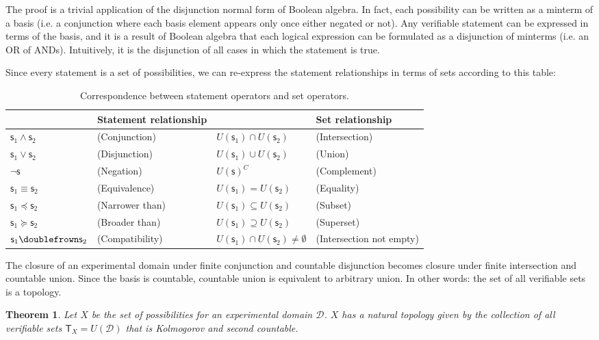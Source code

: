 \documentclass[letterpaper]{article}
\theoremstyle{plain}%
\newtheorem{thrm}{Theorem}[section]
\theoremstyle{definition}
\theoremstyle{remark}
\def\comp{\doublefrown}
\def\narrower{\preccurlyeq}
\def\broader{\succcurlyeq}
\def\AND{\wedge}
\def\OR{\vee}
\def\NOT{\neg}
\newcommand{\stmt}[1][s] {\mathsf{#1}}
\newcommand{\edomain}[1][D] {\mathcal{#1}}
\begin{document}
The proof is a trivial application of the disjunction normal form of Boolean algebra. In fact, each possibility can be written as a minterm of a basis (i.e. a conjunction where each basis element appears only once either negated or not). Any verifiable statement can be expressed in terms of the basis, and it is a result of Boolean algebra that each logical expression can be formulated as a disjunction of minterms (i.e. an OR of ANDs). Intuitively, it is the disjunction of all cases in which the statement is true.

Since every statement is a set of possibilities, we can re-express the statement relationships in terms of sets according to this table:

\begin{table}[h]
	\centering
	\begin{tabular}{p{} p{} p{} p{}}
		& Statement relationship & & Set relationship  \\ 
		\hline 
		$\stmt_1 \AND \stmt_2$ & (Conjunction) & $U(\stmt_1) \cap U(\stmt_2)$ & (Intersection) \\ 
		$\stmt_1 \OR \stmt_2$ & (Disjunction) & $U(\stmt_1) \cup U(\stmt_2)$ & (Union) \\ 
		$\NOT \stmt$ & (Negation) & $U(\stmt)^C$ & (Complement) \\ 
		$\stmt_1 \equiv \stmt_2$ & (Equivalence) & $U(\stmt_1) = U(\stmt_2)$ & (Equality) \\ 
		$\stmt_1 \narrower \stmt_2$ & (Narrower than) & $U(\stmt_1) \subseteq U(\stmt_2)$ & (Subset) \\ 
		$\stmt_1 \broader \stmt_2$ & (Broader than) & $U(\stmt_1) \supseteq U(\stmt_2)$ & (Superset) \\ 
		$\stmt_1 \comp \stmt_2$ & (Compatibility) & $U(\stmt_1) \cap U(\stmt_2) \neq \emptyset$ & (Intersection not empty)
	\end{tabular} 
	\caption{Correspondence between statement operators and set operators.}
\end{table}

The closure of an experimental domain under finite conjunction and countable disjunction becomes closure under finite intersection and countable union. Since the basis is countable, countable union is equivalent to arbitrary union. In other words: the set of all verifiable sets is a topology.

\begin{thrm}
	Let $X$ be the set of possibilities for an experimental domain $\edomain$. $X$ has a natural topology given by the collection of all verifiable sets $\mathsf{T}_X=U(\edomain)$ that is Kolmogorov and second countable.
\end{thrm}
\end{document}
